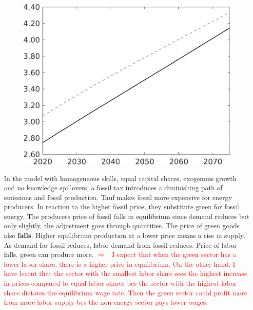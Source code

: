 \documentclass[12pt]{article}
\newcommand{\ar}{$\Rightarrow$ \ }
\newcommand{\tr}[1]{\textcolor{red}{#1}}
\begin{document}
\begin{figure}[h!!]
\begin{minipage}[]{0.32\textwidth}
	\end{minipage}	
\begin{minipage}[]{0.32\textwidth}
\includegraphics[width=1\textwidth]{../../codding_model/own_basedOnFried/optimalPol_010922_revision/figures/all_13Sept22/LevTaufNoTauf_TaulCalib_Equlab_regime0_wh_spillover0_nsk1_xgr1_knspil1_sep1_LFlimit0_emsbase0_countec0_GovRev0_etaa0.79_lgd0.png}
\end{minipage}	
\end{figure}
In the model with homogeneous skills, equal capital shares, exogenous growth and no knowledge spillovers, a fossil tax introduces a diminishing path of emissions and fossil production. Tauf makes fossil more expensive for energy producers. In reaction to the higher fossil price, they substitute green for fossil energy. The producers price of fossil falls in equilibrium since demand reduces but only slightly, the adjustment goes through quantities. The price of green goods also \textbf{falls}. Higher equilibrium production at a lower price means a rise in supply. As demand for fossil reduces, labor demand from fossil reduces. Price of labor falls, green can produce more. \tr{\ar I expect that when the green sector has a lower labor share, there is a higher price in equilibrium. On the other hand, I have learnt that the sector with the smallest labor share sees the highest increase in prices compared to equal labor shares bcs the sector with the highest labor share dictates the equilibrium wage rate. Then the green sector could profit more from more labor supply bcs the non-energy sector pays lower wages. }
\end{document}
